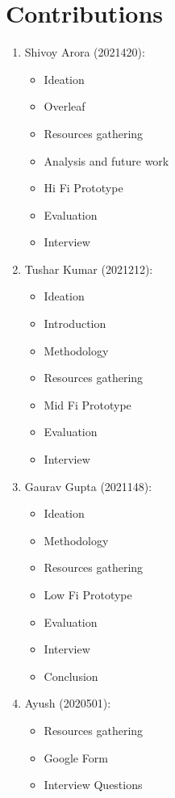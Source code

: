 \documentclass[acmtog]{acmart}
\begin{document}
\section*{Contributions}
\begin{enumerate}
    \item Shivoy Arora (2021420):
    \begin{itemize}
        \item Ideation
        \item Overleaf
        \item Resources gathering
        \item Analysis and future work
        \item Hi Fi Prototype
        \item Evaluation
        \item Interview
    \end{itemize}

    \item Tushar Kumar (2021212):
    \begin{itemize}
        \item Ideation
        \item Introduction
        \item Methodology
        \item Resources gathering
        \item Mid Fi Prototype
        \item Evaluation
        \item Interview
    \end{itemize}

    \item Gaurav Gupta (2021148):
    \begin{itemize}
        \item Ideation
        \item Methodology
        \item Resources gathering
        \item Low Fi Prototype
        \item Evaluation
        \item Interview
        \item Conclusion
    \end{itemize}

    \item Ayush (2020501):
    \begin{itemize}
        \item Resources gathering
        \item Google Form
        \item Interview Questions
    \end{itemize}


\end{enumerate}
\end{document}
